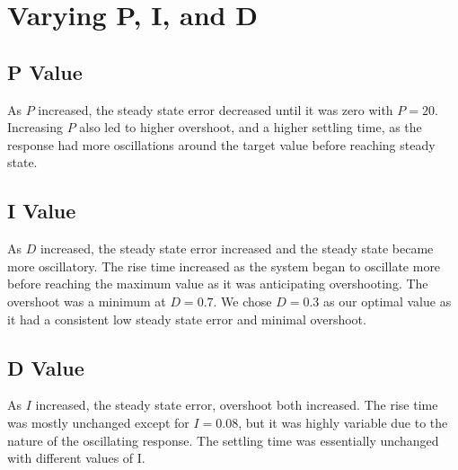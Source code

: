 \section{Varying P, I, and D}
\subsection{P Value}
As \(P\) increased, the steady state error decreased until it was zero with \(P = 20\). Increasing \(P\) also led to higher overshoot, and a higher settling time, as the response had more oscillations around the target value before reaching steady state.
\subsection{I Value}
As \(D\) increased, the steady state error increased and the steady state became more oscillatory. The rise time increased as the system began to oscillate more before reaching the maximum value as it was anticipating overshooting. The overshoot was a minimum at \(D = 0.7\). We chose \(D = 0.3\) as our optimal value as it had a consistent low steady state error and minimal overshoot.
\subsection{D Value}
As \(I\) increased, the steady state error, overshoot both increased. The rise time was mostly unchanged except for \(I = 0.08\), but it was highly variable due to the nature of the oscillating response. The settling time was essentially unchanged with different values of I.

